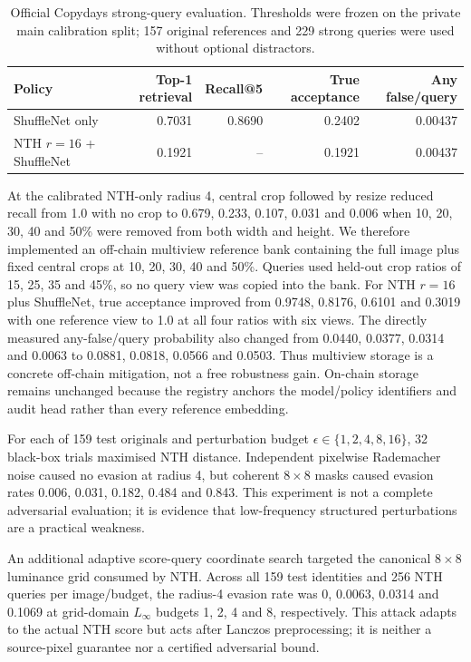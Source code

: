 \documentclass[12pt]{article}
\begin{document}
\begin{table}[ht]
\centering
\caption{Official Copydays strong-query evaluation. Thresholds were frozen on the private main calibration split; 157 original references and 229 strong queries were used without optional distractors.}
\label{tab:copydays}
\begin{tabular}{lrrrr}
\toprule
Policy & Top-1 retrieval & Recall@5 & True acceptance & Any false/query\\
\midrule
ShuffleNet only & 0.7031 & 0.8690 & 0.2402 & 0.00437\\
NTH $r=16$ + ShuffleNet & 0.1921 & -- & 0.1921 & 0.00437\\
\bottomrule
\end{tabular}
\end{table}

At the calibrated NTH-only radius 4, central crop followed by resize reduced recall from 1.0 with no crop to 0.679, 0.233, 0.107, 0.031 and 0.006 when 10, 20, 30, 40 and 50\% were removed from both width and height. We therefore implemented an off-chain multiview reference bank containing the full image plus fixed central crops at 10, 20, 30, 40 and 50\%. Queries used held-out crop ratios of 15, 25, 35 and 45\%, so no query view was copied into the bank. For NTH $r=16$ plus ShuffleNet, true acceptance improved from 0.9748, 0.8176, 0.6101 and 0.3019 with one reference view to 1.0 at all four ratios with six views. The directly measured any-false/query probability also changed from 0.0440, 0.0377, 0.0314 and 0.0063 to 0.0881, 0.0818, 0.0566 and 0.0503. Thus multiview storage is a concrete off-chain mitigation, not a free robustness gain. On-chain storage remains unchanged because the registry anchors the model/policy identifiers and audit head rather than every reference embedding.

For each of 159 test originals and perturbation budget $\epsilon\in\{1,2,4,8,16\}$, 32 black-box trials maximised NTH distance. Independent pixelwise Rademacher noise caused no evasion at radius 4, but coherent $8\times8$ masks caused evasion rates 0.006, 0.031, 0.182, 0.484 and 0.843. This experiment is not a complete adversarial evaluation; it is evidence that low-frequency structured perturbations are a practical weakness.

An additional adaptive score-query coordinate search targeted the canonical $8\times8$ luminance grid consumed by NTH. Across all 159 test identities and 256 NTH queries per image/budget, the radius-4 evasion rate was 0, 0.0063, 0.0314 and 0.1069 at grid-domain $L_\infty$ budgets 1, 2, 4 and 8, respectively. This attack adapts to the actual NTH score but acts after Lanczos preprocessing; it is neither a source-pixel guarantee nor a certified adversarial bound.
\end{document}
